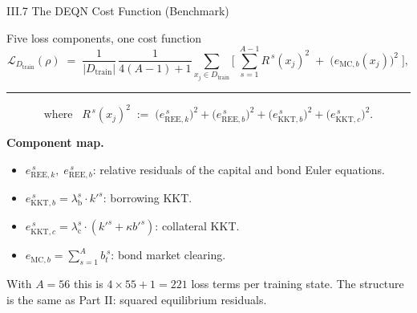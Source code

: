 \documentclass[aspectratio=169,11pt]{beamer}
\newcommand{\emphc}[1]{\textcolor{harvardcrimson}{#1}}
\newcommand{\Loss}{\mathcal{L}}
\begin{document}
\begin{frame}{III.7 The DEQN Cost Function (Benchmark)}
\footnotesize
\begin{block}{Five loss components, one cost function}
\vspace{-2pt}
\[
\Loss_{D_{\text{train}}}(\rho) \;=\; \frac{1}{|D_{\text{train}}|}\,\frac{1}{4(A-1)+1}\!
\sum_{x_j \in D_{\text{train}}}\!\Biggl[\;\sum_{s=1}^{A-1} R^{\,s}(x_j)^2 \;+\; \bigl(e_{\text{MC},b}(x_j)\bigr)^2\;\Biggr],
\]

\vspace{4pt}
\hrule
\vspace{4pt}
\[
\text{where}\;\;\;R^{\,s}(x_j)^2 \;:=\; \bigl(e_{\text{REE},k}^{\,s}\bigr)^2 + \bigl(e_{\text{REE},b}^{\,s}\bigr)^2 + \bigl(e_{\text{KKT},b}^{\,s}\bigr)^2 + \bigl(e_{\text{KKT},c}^{\,s}\bigr)^2.
\]
\vspace{-4pt}
\end{block}

\vspace{-2pt}
\textbf{Component map.}
\begin{itemize}\itemsep0pt
    \item $e_{\text{REE},k}^{\,s},\;e_{\text{REE},b}^{\,s}$: relative residuals of the capital and bond Euler equations.
    \item $e_{\text{KKT},b}^{\,s} = \lambda_{\text{b}}^s \cdot k'^s$: borrowing KKT.
    \item $e_{\text{KKT},c}^{\,s} = \lambda_{\text{c}}^s \cdot (k'^s + \kappa b'^s)$: collateral KKT.
    \item $e_{\text{MC},b} = \sum_{s=1}^{A} b_t^{\,s}$: bond market clearing.
\end{itemize}

\vspace{0.2em}
{\scriptsize With $A = 56$ this is \emphc{$4 \times 55 + 1 = 221$} loss terms per training state.  The structure is the same as Part II: squared equilibrium residuals.}
\end{frame}
\end{document}
